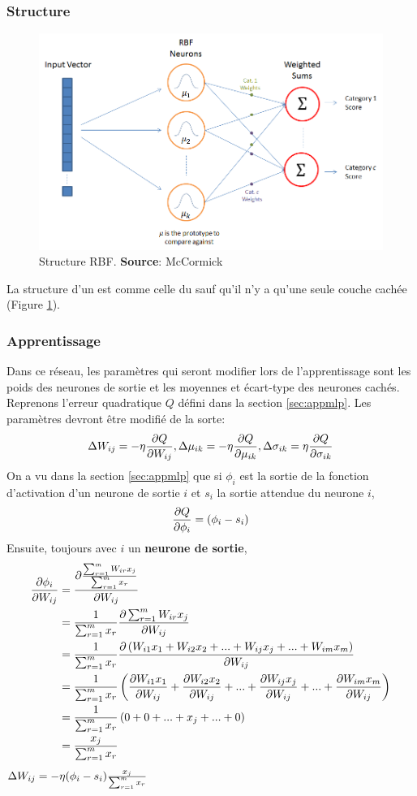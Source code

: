 \subsubsection{Structure}
\begin{figure}
 \centering
 \includegraphics[scale=0.5]{../figures/RBFstruct.png}
 \caption{Structure RBF. \textbf{Source}: McCormick\cite{RBFtuto}}
 \label{structurerbf}
\end{figure}
La structure d'un \rbf est comme celle du \mlp sauf qu'il n'y a qu'une seule couche cachée (Figure \ref{structurerbf}).
\subsubsection{Apprentissage}
Dans ce réseau, les paramètres qui seront modifier lors de l'apprentissage sont les poids des neurones de sortie et les moyennes et écart-type des neurones cachés.
Reprenons l'erreur quadratique $Q$ défini dans la section \ref{sec:appmlp}.
Les paramètres devront être modifié de la sorte:
\[\Delta W_{ij} = -\eta \frac{\partial Q}{\partial W_{ij}}, \Delta \mu_{ik} = -\eta \frac{\partial Q}{\partial \mu_{ik}}, \Delta \sigma_{ik} = \eta \frac{\partial Q}{\partial \sigma_{ik}}\]
On a vu dans la section \ref{sec:appmlp} que si $\phi_i$ est la sortie de la fonction d'activation d'un neurone de sortie $i$ et $s_i$ la sortie attendue du neurone $i$,
\[\frac{\partial Q}{\partial \phi_i} = (\phi_i - s_i)\]
Ensuite, toujours avec $i$ un \textbf{neurone de sortie},
\begin{equation}
 \begin{split}
  \frac{\partial \phi_i}{\partial W_{ij}} & = \frac{\partial \frac{\sum_{r=1}^{m}W_{ir}x_{j}}{\sum_{r=1}^{m}x_{r}}}{\partial W_{ij}}\\
  ~ & = \frac{1}{\sum_{r=1}^{m}x_{r}} \frac{\partial \sum_{r=1}^{m}W_{ir}x_{j}}{\partial W_{ij}}\\
  ~ & = \frac{1}{\sum_{r=1}^{m}x_{r}} \frac{\partial \left(W_{i1}x_1 + W_{i2}x_2 + ... + W_{ij}x_j + ... + W_{im}x_m\right)}{\partial W_{ij}}\\
  ~ & = \frac{1}{\sum_{r=1}^{m}x_{r}} \left(\frac{\partial W_{i1}x_1}{\partial W_{ij}} + \frac{\partial W_{i2}x_2}{\partial W_{ij}} + ... + \frac{\partial W_{ij}x_j}{\partial W_{ij}} + ... + \frac{\partial W_{im}x_m}{\partial W_{ij}}\right)\\
  ~ & = \frac{1}{\sum_{r=1}^{m}x_{r}} \left(0 + 0 + ... + x_j + ... + 0\right)\\
  ~ & = \frac{x_j}{\sum_{r=1}^{m}x_{r}}
 \end{split}
\end{equation}\label{eq:b}
$\Delta W_{ij} = -\eta (\phi_i - s_i) \frac{x_j}{\sum_{r=1}^{m}x_{r}}$\\

